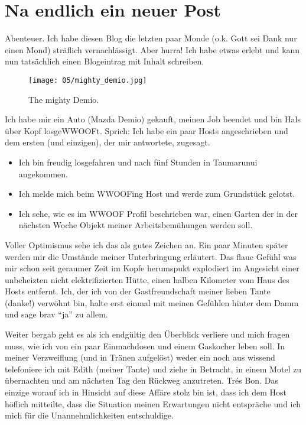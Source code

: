 \chapter{Na endlich ein neuer Post}

Abenteuer. Ich habe diesen Blog die letzten paar Monde (o.k. Gott sei
Dank nur einen Mond) sträflich vernachlässigt. Aber hurra! Ich habe
etwas erlebt und kann nun tatsächlich einen Blogeintrag mit Inhalt
schreiben.

\begin{figure}[h]
  \centering
  \texttt{[image: 05/mighty\_demio.jpg]}
  \caption*{The mighty Demio.}
\end{figure}

Ich habe mir ein Auto (Mazda Demio) gekauft, meinen Job beendet und bin
Hals über Kopf losgeWWOOFt. Sprich: Ich habe ein paar Hosts
angeschrieben und dem ersten (und einzigen), der mir antwortete,
zugesagt.

\begin{itemize}
\tightlist
\item
  Ich bin freudig losgefahren und nach fünf Stunden in Taumarunui
  angekommen.
\item
  Ich melde mich beim WWOOFing Host und werde zum Grundstück gelotst.
\item
  Ich sehe, wie es im WWOOF Profil beschrieben war, einen Garten der in
  der nächsten Woche Objekt meiner Arbeitsbemühungen werden soll.
\end{itemize}

Voller Optimismus sehe ich das als gutes Zeichen an. Ein paar Minuten
später werden mir die Umstände meiner Unterbringung erläutert. Das
flaue Gefühl was mir schon seit geraumer Zeit im Kopfe herumspukt
explodiert im Angesicht einer unbeheizten nicht elektrifizierten
Hütte, einen halben Kilometer vom Haus des Hosts entfernt. Ich, der
ich von der Gastfreundschaft meiner lieben Tante (danke!) verwöhnt
bin, halte erst einmal mit meinen Gefühlen hinter dem Damm und sage
brav ``ja'' zu allem.

Weiter bergab geht es als ich endgültig den Überblick verliere und
mich fragen muss, wie ich von ein paar Einmachdosen und einem
Gaskocher leben soll. In meiner Verzweiflung (und in Tränen aufgelöst)
weder ein noch aus wissend telefoniere ich mit Edith (meiner Tante)
und ziehe in Betracht, in einem Motel zu übernachten und am nächsten
Tag den Rückweg anzutreten. Trés Bon. Das einzige worauf ich in
Hinsicht auf diese Affäre stolz bin ist, dass ich dem Host höflich
mitteilte, dass die Situation meinen Erwartungen nicht entspräche und
ich mich für die Unannehmlichkeiten entschuldige.

